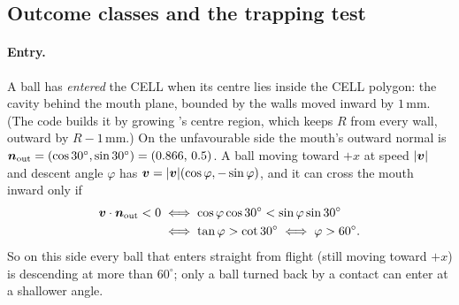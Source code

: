 \subsection{Outcome classes and the trapping test}
\label{sec:contact-outcomes}

\paragraph{Entry.}
A ball has \emph{entered} the CELL when its centre lies inside the CELL polygon: the cavity
behind the mouth plane, bounded by the walls moved inward by $1$\,\unit{mm}\assumed. (The code
builds it by growing 's centre region, which keeps $R$ from every wall, outward by
$R-1$\,\unit{mm}.) On the unfavourable side the mouth's outward normal is
$\bm{n}_{\text{out}}=(\cos30^\circ,\sin30^\circ)=(0.866,\,0.5)$\derived. A ball moving
toward $+x$ at speed $|\bm{v}|$ and descent angle $\varphi$ has
$\bm{v}=|\bm{v}|(\cos\varphi,-\sin\varphi)$, and it can cross the mouth inward only if
\begin{align}
  \bm{v}\cdot\bm{n}_{\text{out}} < 0
  &\iff \cos\varphi\cos30^\circ < \sin\varphi\sin30^\circ \nonumber\\
  &\iff \tan\varphi > \cot30^\circ
  \iff \varphi > 60^\circ .
  \label{eq:contact-entry-angle}
\end{align}
So on this side every ball that enters straight from flight (still moving toward $+x$) is
descending at more than $60^\circ$\derived; only a ball turned back by a contact can enter at a
shallower angle.

